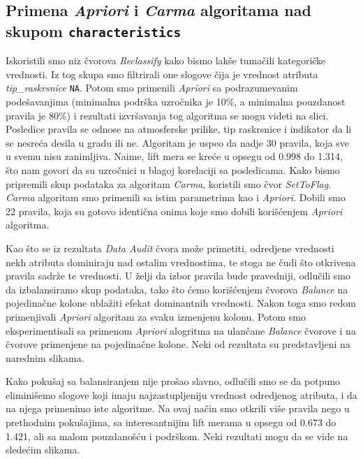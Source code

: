 \documentclass[a4paper,10pt]{article}
\begin{document}
\subsection{Primena \textit{Apriori} i \textit{Carma} algoritama nad skupom \texttt{characteristics}}
Iskoristili smo niz čvorova \textit{Reclassify} kako bismo lakše tumačili kategoričke vrednosti. Iz tog skupa smo filtrirali one slogove čija je 
vrednost atributa \textit{tip\_raskrsnice} \texttt{NA}. Potom smo primenili \textit{Apriori} sa podrazumevanim podešavanjima 
(minimalna podrška uzročnika je 10\%, a minimalna pouzdanost pravila je 80\%) i rezultati izvršavanja
tog algoritma se mogu videti na slici. Posledice pravila se odnose na atmosferske prilike, tip raskrsnice i indikator da li se nesreća desila u gradu ili ne.
Algoritam je uspeo da nadje 30 pravila, koja sve u svemu nisu zanimljiva. Naime, lift mera se kreće u opsegu od 0.998 do 1.314, što nam govori da su
uzročnici u blagoj korelaciji sa posledicama. Kako bismo pripremili skup podataka za algoritam \textit{Carma}, koristili smo čvor \textit{SetToFlag}. 
\textit{Carma} algoritam smo primenili sa istim parametrima kao i \textit{Apriori}. Dobili smo 22 pravila, koja su gotovo identična onima koje smo
dobili korišćenjem \textit{Apriori} algoritma. 
 
Kao što se iz rezultata \textit{Data Audit} čvora može primetiti, odredjene vrednosti nekh atributa dominiraju nad ostalim vrednostima, te stoga ne
čudi što otkrivena pravila sadrže te vrednosti. U želji da izbor pravila bude pravedniji, odlučili smo da izbalansiramo skup podataka, tako što 
ćemo korišćenjem čvorova \textit{Balance} na pojedinačne kolone ublažiti efekat dominantnih vrednosti. Nakon toga smo redom primenjivali \textit{Apriori}
algoritam za svaku izmenjenu kolonu. Potom smo eksperimentisali sa primenom \textit{Apriori} alogritma na ulančane \textit{Balance} čvorove i na 
čvorove primenjene na pojedinačne kolone. Neki od rezultata su predstavljeni na narednim slikama.

Kako pokušaj sa balansiranjem nije prošao slavno, odlučili smo se da potpuno eliminišemo slogove koji imaju najzastupljeniju vrednost odredjenog atributa,
i da na njega primenimo iste algoritme. Na ovaj način smo otkrili više pravila nego u prethodnim pokušajima, sa interesantnijim lift merama 
u opsegu od 0.673 do 1.421, ali sa malom pouzdanošću i podrškom. Neki rezultati mogu da se vide na sledećim slikama.

% 	
\end{document}
